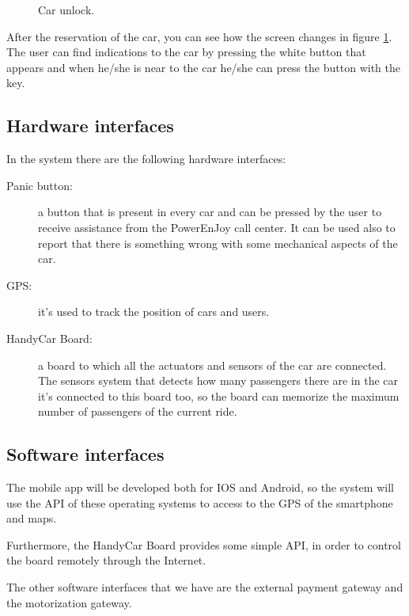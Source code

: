\begin{figure}
	\caption{Car unlock.}
	\label{fig:mockup_car_unlock}
\end{figure}

After the reservation of the car, you can see how the screen changes in figure \ref{fig:mockup_car_unlock}. The user can find indications to the car by pressing the white button that appears and when he/she is near to the car he/she can press the button with the key.

\subsection{Hardware interfaces}
In the system there are the following hardware interfaces:
\begin{description}
	\item [Panic button:] a button that is present in every car and can be pressed by the user to receive assistance from the PowerEnJoy call center. It can be used also to report that there is something wrong with some mechanical aspects of the car.
	\item [GPS:] it's used to track the position of cars and users.
	\item [HandyCar Board:] a board to which all the actuators and sensors of the car are connected. The sensors system that detects how many passengers there are in the car it's connected to this board too, so the board can memorize the maximum number of passengers of the current ride.
\end{description}

\subsection{Software interfaces}
The mobile app will be developed both for IOS and Android, so the system will use the API of these operating systems to access to the GPS of the smartphone and maps.

Furthermore, the HandyCar Board provides some simple API, in order to control the board remotely through the Internet.

The other software interfaces that we have are the external payment	gateway and the motorization gateway.




